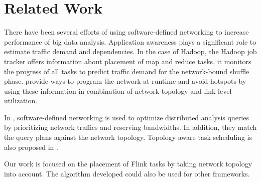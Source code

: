 \section{Related Work}
There have been several efforts of using software-defined networking to increase performance of big
data analysis.  Application awareness plays a significant role to estimate traffic demand and
dependencies. In the case of Hadoop, the Hadoop job tracker offers information about placement of
map and reduce tasks, it monitors the progress of all tasks to predict traffic demand for the
network-bound shuffle phase. \cite{programmingatruntime} \cite {pythia} provide ways to program the
network at runtime and avoid hotspots by using these information in combination of network topology
and link-level utilization.

In \cite{query}, software-defined networking is used to optimize distributed analysis queries by
prioritizing network traffics and reserving bandwidths. In addition, they match the query plans
against the network topology. Topology aware task scheduling is also proposed in
\cite{programmingatruntime}.

Our work is focused on the placement of Flink tasks by taking network topology into account. The
algorithm developed could also be used for other frameworks.

